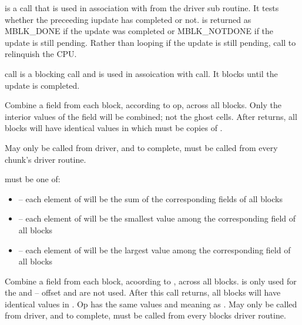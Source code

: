 \documentclass[10pt]{article}
\begin{document}
\vspace{0.2in}
      is a call that is used in association with 
      from the driver sub routine.  It tests whether
      the preceeding iupdate has completed or not.
      is returned as MBLK\_DONE if the update was completed or 
      MBLK\_NOTDONE if the update is still pending.
     Rather than looping if the update is still pending, call 
     to relinquish the CPU.

\vspace{0.2in}
      call is a blocking call and is used in assoication 
     with  call. It blocks until the update is completed.

\vspace{0.2 in}
     Combine a field from each block, according to op, across all blocks.
     Only the interior values of the field will be combined; not the ghost cells.
     After  returns, all blocks will have identical
values in  which must be  copies of .


     May only be called from driver, and to complete, must be called
     from every chunk's driver routine.

      must be one of:

\begin{itemize}
        \item {}-- each element of  will be the sum 
of the corresponding fields of all blocks
        \item {}-- each element of  will be the 
smallest value among the corresponding field of all blocks
        \item {}-- each element of  will be the largest 
value among the corresponding field of all blocks
\end{itemize}

\vspace{0.2in}
     Combine a field from each block, acoording to , across all blocks.
 is only used for the  and -- offset and
 are not used.  After this call returns, all blocks will have
identical values in .  Op has the same values and meaning as
.
     May only be called from driver, and to complete, must be called
     from every blocks driver routine.
\end{document}
